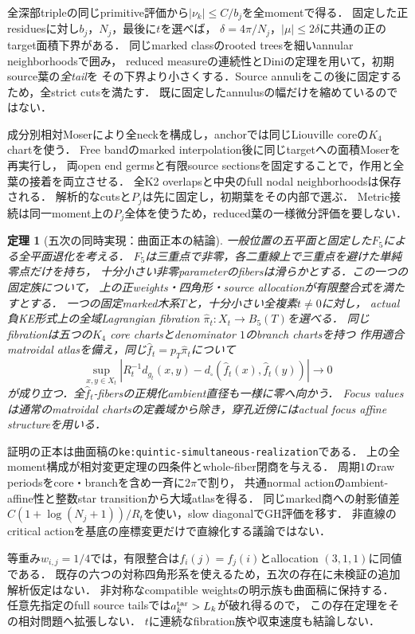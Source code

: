 \documentclass[a4paper,11pt]{ltjsarticle}
\numberwithin{equation}{section}
\theoremstyle{plain}
\newtheorem{theorem}{定理}[section]
\theoremstyle{definition}
\theoremstyle{remark}
\begin{document}
全深部tripleの同じprimitive評価から$|\nu_k|\le C/b_j$を全momentで得る．
固定した正residuesに対し$b_j$，$N_j$，最後に$t$を選べば，
$\delta=4\pi/N_j$，$|\mu|\le2\delta$に共通の正のtarget面積下界がある．
同じmarked classのrooted treesを細いannular neighborhoodsで囲み，
reduced measureの連続性とDiniの定理を用いて，初期source葉の\emph{全tail}を
その下界より小さくする．Source annuliをこの後に固定するため，全strict cutsを満たす．
既に固定したannulusの幅だけを縮めているのではない．

成分別相対Moserにより全neckを構成し，anchorでは同じLiouville coreの$K_4$ chartを使う．
Free bandのmarked interpolation後に同じtargetへの面積Moserを再実行し，
両open end germsと有限source sectionsを固定することで，作用と全葉の接着を両立させる．
全K2 overlapsと中央のfull nodal neighborhoodsは保存される．
解析的なcutsと$P_j$は先に固定し，初期葉をその内部で選ぶ．
Metric接続は同一moment上の$P_j$全体を使うため，reduced葉の一様微分評価を要しない．

\begin{theorem}[五次の同時実現：曲面正本の結論]
\label{thm:quintic-simultaneous-summary}
一般位置の五平面と固定した$F_5$による全平面退化を考える．
$F_5$は三重点で非零，各二重線上で三重点を避けた単純零点だけを持ち，
十分小さい非零parameterのfibersは滑らかとする．この一つの固定族について，
上の正weights・四角形・source allocationが有限整合式を満たすとする．
一つの固定marked木系$T$と，十分小さい全複素$t\ne0$に対し，
actual負KE形式上の全域Lagrangian fibration
$\widehat\pi_t:X_t\to B_5(T)$を選べる．
同じfibrationは五つの$K_4$ core chartsとdenominator $1$のbranch chartsを持つ
作用適合matroidal atlasを備え，同じ$\widehat f_t=p_T\widehat\pi_t$について
\[
 \sup_{x,y\in X_t}
 \left|R_t^{-1}d_{g_t}(x,y)
       -d_\square(\widehat f_t(x),\widehat f_t(y))\right|\longrightarrow0
\]
が成り立つ．全$\widehat f_t$-fibersの正規化ambient直径も一様に零へ向かう．
Focus valuesは通常のmatroidal chartsの定義域から除き，穿孔近傍にはactual focus affine structureを用いる．
\end{theorem}

証明の正本は曲面稿の\texttt{ke:quintic-simultaneous-realization}である．
上の全moment構成が相対変更定理の四条件とwhole-fiber閉商を与える．
周期$1$のraw periodsをcore・branchを含め一斉に$2\pi$で割り，
共通normal actionのambient-affine性と整数star transitionから大域atlasを得る．
同じmarked商への射影値差$C(1+\log(N_j+1))/R_t$を使い，slow diagonalでGH評価を移す．
非直線のcritical actionを基底の座標変更だけで直線化する議論ではない．

等重み$w_{i,j}=1/4$では，有限整合は$f_i(j)=f_j(i)$とallocation $(3,1,1)$に同値である．
既存の六つの対称四角形系を使えるため，五次の存在に未検証の追加解析仮定はない．
非対称なcompatible weightsの明示族も曲面稿に保持する．
任意先指定のfull source tailsでは$a_k^{\rm tar}>L_k$が破れ得るので，
この存在定理をその相対問題へ拡張しない．
$t$に連続なfibration族や収束速度も結論しない．
\end{document}
